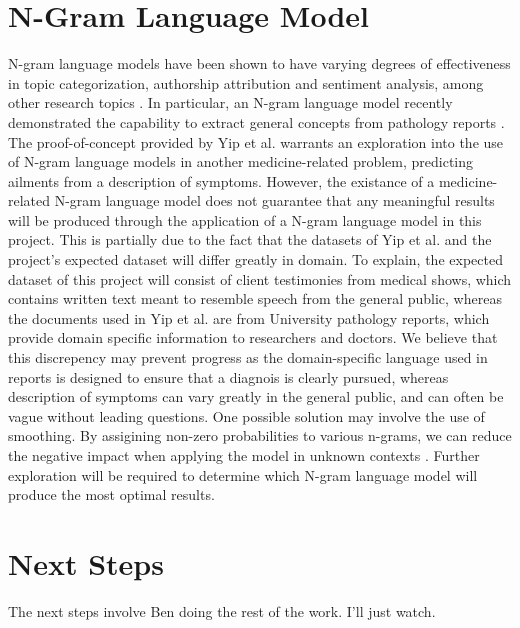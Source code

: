 \documentclass[12pt, final, onecolumn, comsoc, conference]{IEEEtran}
\begin{document}
\section{N-Gram Language Model}
N-gram language models have been shown to have varying degrees of effectiveness in topic categorization,
authorship attribution and sentiment analysis, among other research topics \cite{n-gram-analysis}. In particular, an N-gram language
model recently demonstrated the capability to extract general concepts from pathology reports \cite{yip}.
The proof-of-concept provided by Yip et al. warrants an exploration into the use of N-gram language models
in another medicine-related problem, predicting ailments from a description of symptoms.
However, the existance of a medicine-related N-gram language model does not guarantee that any
meaningful results will be produced through the application of a N-gram language model in this project.
This is partially due to the fact that the datasets of Yip et al. and the project's expected dataset will differ
greatly in domain.
To explain, the expected dataset of this project will consist of client testimonies from medical shows,
which contains written text meant to resemble speech from the general public,
whereas the documents used in Yip et al. are from University pathology reports,
which provide domain specific information to researchers and doctors.
We believe that this discrepency may prevent progress as the domain-specific language used in reports
is designed to ensure that a diagnois is clearly pursued, whereas description of symptoms can vary greatly
in the general public, and can often be vague without leading questions.
One possible solution may involve the use of smoothing. By assigining non-zero
probabilities to various n-grams, we can reduce the negative impact when applying the model in unknown contexts \cite{class}.
Further exploration will be required to determine which N-gram language model will produce the most
optimal results.

\section{Next Steps}
The next steps involve Ben doing the rest of the work. I'll just watch.


\end{document}
